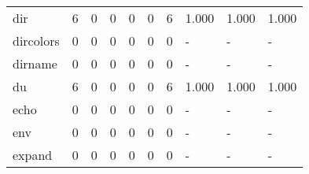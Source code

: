 \begin{longtable}{lp{2.0cm}p{2.0cm}p{2.0cm}p{2.0cm}p{2.0cm}p{2.0cm}p{2.0cm}p{2.0cm}p{2.0cm}}
dir       &                      6 &                                             0 &                                            0 &                                           0 &                                            0 &                                          6 &                                1.000 &                                  1.000 &                                1.000 \\
dircolors &                      0 &                                             0 &                                            0 &                                           0 &                                            0 &                                          0 &                                    - &                                      - &                                    - \\
dirname   &                      0 &                                             0 &                                            0 &                                           0 &                                            0 &                                          0 &                                    - &                                      - &                                    - \\
du        &                      6 &                                             0 &                                            0 &                                           0 &                                            0 &                                          6 &                                1.000 &                                  1.000 &                                1.000 \\
echo      &                      0 &                                             0 &                                            0 &                                           0 &                                            0 &                                          0 &                                    - &                                      - &                                    - \\
env       &                      0 &                                             0 &                                            0 &                                           0 &                                            0 &                                          0 &                                    - &                                      - &                                    - \\
expand    &                      0 &                                             0 &                                            0 &                                           0 &                                            0 &                                          0 &                                    - &                                      - &                                    - \\

\end{longtable}
